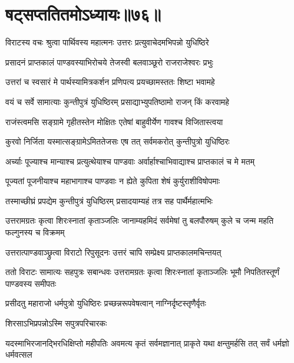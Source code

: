 \chapter{षट्सप्ततितमोऽध्यायः॥७६॥}

\twolineshloka
{विराटस्य वचः श्रुत्वा पार्थिवस्य महात्मनः}
{उत्तरः प्रत्युवाचेदमभिपन्नो युधिष्ठिरे}


\twolineshloka
{प्रसादनं प्राप्तकालं पाण्डवस्याभिरोचये}
{तेजस्वी बलवाञ्छूरो राजराजेश्वरः प्रभुः}


\twolineshloka
{उत्तरां च स्वसारं मे पार्थस्यामित्रकर्शन}
{प्रणिपत्य प्रयच्छामस्ततः शिष्टा भवामहे}



\twolineshloka
{वयं च सर्वे सामात्याः कुन्तीपुत्रं युधिष्ठिरम्}
{प्रसाद्याभ्युपतिष्ठामो राजन् किं करवामहे}


\twolineshloka
{राजंस्त्वमसि सङ्ग्रामे गृहीतस्तेन मोक्षितः}
{एतेषां बाहुवीर्येण गावश्च विजितास्त्वया}


\twolineshloka
{कुरवो निर्जिता यस्मात्सङ्ग्रामेऽमिततेजसः}
{एष तत् सर्वमकरोत् कुन्तीपुत्रो युधिष्ठिरः}


\twolineshloka
{अर्च्याः पूज्याश्च मान्याश्च प्रत्युत्थेयाश्च पाण्डवाः}
{अर्वार्हाश्चाभिवाद्याश्च प्राप्तकालं च मे मतम्}


\twolineshloka
{पूज्यतां पूजनीयाश्च महाभागाश्च पाण्डवाः}
{न ह्येते कुपिता शेषं कुर्युराशीविषोपमाः}


\twolineshloka
{तस्माच्छीघ्रं प्रपद्येम कुन्तीपुत्रं युधिष्ठिरम्}
{प्रसादयाम्यहं तत्र सह पार्थैर्महात्मभिः}


\threelineshloka
{उत्तरामग्रतः कृत्वा शिरःस्नातां कृताञ्जलिः}
{जानाम्यहमिदं सर्वमेषां तु बलपौरुषम्}
{कुले च जन्म महति फल्गुनस्य च विक्रमम्}




\twolineshloka
{उत्तरात्पाण्डवाञ्छ्रुत्वा विराटो रिपुसूदनः}
{उत्तरं चापि सम्प्रेक्ष्य प्राप्तकालमचिन्तयत्}


\threelineshloka
{ततो विराटः सामात्यः सहपुत्रः सबान्धवः}
{उत्तरामग्रतः कृत्वा शिरःस्नातां कृताञ्जलिः}
{भूमौ निपतितस्तूर्णं पाण्डवस्य समीपतः}




\twolineshloka
{प्रसीदतु महाराजो धर्मपुत्रो युधिष्ठिरः}
{प्रच्छन्नरूपवेषत्वान् नाग्निर्दृष्टस्तृणैर्वृतः}


\onelineshloka
{शिरसाऽभिप्रपन्नोऽस्मि सपुत्रपरिचारकः}

\threelineshloka
{यदस्माभिरजानद्भिरधिक्षिप्तो महीपतिः}
{अवमत्य कृतं सर्वमज्ञानात् प्राकृते यथा}
{क्षन्तुमर्हसि तत् सर्वं धर्मज्ञो धर्मवत्सल}


